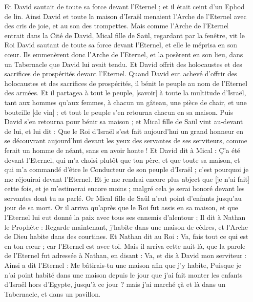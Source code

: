 \begin{multicols}{2}
Et David sautait de toute sa force devant l'Eternel ; et il était ceint d'un Ephod de lin.
Ainsi David et toute la maison d'Israël menaient l'Arche de l'Eternel avec des cris de joie, et au son des trompettes.
Mais comme l'Arche de l'Eternel entrait dans la Cité de David, Mical fille de Saül, regardant par la fenêtre, vit le Roi David sautant de toute sa force devant l'Eternel, et elle le méprisa en son cœur.
Ils emmenèrent donc l'Arche de l'Eternel, et la posèrent en son lieu, dans un Tabernacle que David lui avait tendu. Et David offrit des holocaustes et des sacrifices de prospérités devant l'Eternel.
Quand David eut achevé d'offrir des holocaustes et des sacrifices de prospérités, il bénit le peuple au nom de l'Eternel des armées.
Et il partagea à tout le peuple, [savoir] à toute la multitude d'Israël, tant aux hommes qu'aux femmes, à chacun un gâteau, une pièce de chair, et une bouteille [de vin] ; et tout le peuple s'en retourna chacun en sa maison.
Puis David s'en retourna pour bénir sa maison ; et Mical fille de Saül vint au-devant de lui, et lui dit : Que le Roi d'Israël s'est fait aujourd'hui un grand honneur en se découvrant aujourd'hui devant les yeux des servantes de ses serviteurs, comme ferait un homme de néant, sans en avoir honte !
Et David dit à Mical : Ç'a été devant l'Eternel, qui m'a choisi plutôt que ton père, et que toute sa maison, et qui m'a commandé d'être le Conducteur de son peuple d'Israël ; c'est pourquoi je me réjouirai devant l'Eternel.
Et je me rendrai encore plus abject que [je n'ai fait] cette fois, et je m'estimerai encore moins ; malgré cela je serai honoré devant les servantes dont tu as parlé.
Or Mical fille de Saül n'eut point d'enfants jusqu'au jour de sa mort.
\VerseOne{}Or il arriva qu'après que le Roi fut assis en sa maison, et que l'Eternel lui eut donné la paix avec tous ses ennemis d'alentour ;
Il dit à Nathan le Prophète : Regarde maintenant, j'habite dans une maison de cèdres, et l'Arche de Dieu habite dans des courtines.
Et Nathan dit au Roi : Va, fais tout ce qui est en ton cœur ; car l'Eternel est avec toi.
Mais il arriva cette nuit-là, que la parole de l'Eternel fut adressée à Nathan, en disant :
Va, et dis à David mon serviteur : Ainsi a dit l'Eternel : Me bâtirais-tu une maison afin que j'y habite,
Puisque je n'ai point habité dans une maison depuis le jour que j'ai fait monter les enfants d'Israël hors d'Egypte, jusqu'à ce jour ? mais j'ai marché çà et là dans un Tabernacle, et dans un pavillon.

\end{multicols}
